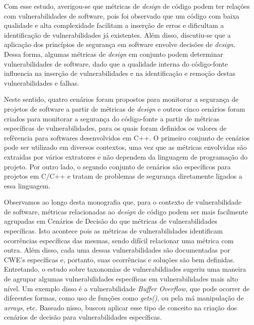 %

Com esse estudo, averigou-se que métricas de \emph{design} de código podem ter relações com  vulnerabilidades de software, pois foi observado que um código com baixa qualidade e alta complexidade facilitam a inserção de erros e dificultam a identificação de vulnerabilidades já existentes. Além disso, discutiu-se que a aplicação dos princípios de segurança em software envolve decisões de \emph{design}. Dessa forma, algumas métricas de \emph{design} em conjunto podem determinar vulnerabilidades de software, dado que a qualidade interna do código-fonte influencia na inserção de vulnerabilidades e na identificação e remoção destas vulnerabilidades e falhas.

%

Neste sentido, quatro cenários foram propostos para monitorar a segurança de projetos de software a partir de métricas de \emph{design} e outros cinco cenários foram criados para monitorar a segurança do código-fonte a partir de métricas específicas de vulnerabilidades, para os quais foram definidos os valores de refêrencia para softwares desenvolvidos em C++. O primeiro conjunto de cenários pode ser utilizado em diversos contextos, uma vez que as métricas envolvidas são extraídas por vários extratores e não dependem da linguagem de programação do projeto. Por outro lado, o segundo conjunto de cenários são específicos para projetos em C/C++ e tratam de problemas de segurança diretamente ligados a essa linguagem.

%

Observamos ao longo desta monografia que, para o contexto de vulnerabilidade de software, métricas relacionadas ao \emph{design} de código podem ser mais facilmente agrupadas em Cenários de Decisão do que métricas de vulnerabilidades específicas. Isto acontece pois as métricas de vulnerabilidades identificam ocorrências específicas das mesmas, sendo difícil relacionar uma métrica com outra. Além disso, cada uma dessas vulnerabilidades são documentadas por CWE's específicas e, portanto, suas ocorrências e soluções são bem definidas. Entretando, o estudo sobre taxonomias de vulnerabildiades sugeriu uma maneira de agrupar algumas vulnerabilidades específicas em vulnerabilidades mais alto nível. Um exemplo disso é a vulnerabilidade \emph{Buffer Overflow}, que pode ocorrer de diferentes formas, como uso de funções como \emph{gets()}, ou pela má manipulação de \emph{arrays}, etc. Baseado nisso,  buscou aplicar esse tipo de conceito na criação dos cenários de decisão para vulnerabilidades específicas.

